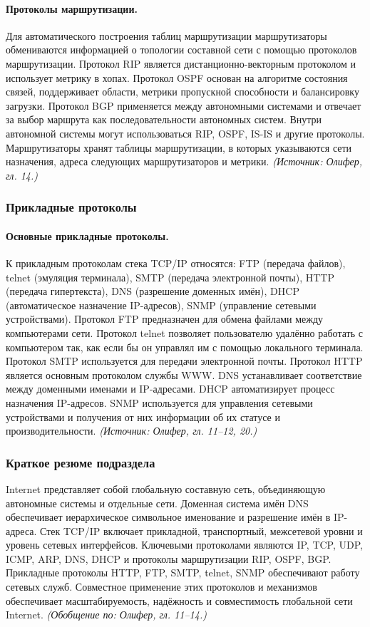 \documentclass[a4paper,12pt]{article}
\begin{document}
\paragraph{Протоколы маршрутизации.}
Для автоматического построения таблиц маршрутизации маршрутизаторы обмениваются информацией о топологии составной сети с помощью протоколов маршрутизации. Протокол RIP является дистанционно-векторным протоколом и использует метрику в хопах. Протокол OSPF основан на алгоритме состояния связей, поддерживает области, метрики пропускной способности и балансировку загрузки. Протокол BGP применяется между автономными системами и отвечает за выбор маршрута как последовательности автономных систем. Внутри автономной системы могут использоваться RIP, OSPF, IS-IS и другие протоколы. Маршрутизаторы хранят таблицы маршрутизации, в которых указываются сети назначения, адреса следующих маршрутизаторов и метрики.
\textit{(Источник: Олифер, гл. 14.)}

\subsubsection{Прикладные протоколы}

\paragraph{Основные прикладные протоколы.}
К прикладным протоколам стека TCP/IP относятся: FTP (передача файлов), telnet (эмуляция терминала), SMTP (передача электронной почты), HTTP (передача гипертекста), DNS (разрешение доменных имён), DHCP (автоматическое назначение IP-адресов), SNMP (управление сетевыми устройствами). Протокол FTP предназначен для обмена файлами между компьютерами сети. Протокол telnet позволяет пользователю удалённо работать с компьютером так, как если бы он управлял им с помощью локального терминала. Протокол SMTP используется для передачи электронной почты. Протокол HTTP является основным протоколом службы WWW. DNS устанавливает соответствие между доменными именами и IP-адресами. DHCP автоматизирует процесс назначения IP-адресов. SNMP используется для управления сетевыми устройствами и получения от них информации об их статусе и производительности.
\textit{(Источник: Олифер, гл. 11–12, 20.)}

\subsubsection{Краткое резюме подраздела}
Internet представляет собой глобальную составную сеть, объединяющую автономные системы и отдельные сети. Доменная система имён DNS обеспечивает иерархическое символьное именование и разрешение имён в IP-адреса. Стек TCP/IP включает прикладной, транспортный, межсетевой уровни и уровень сетевых интерфейсов. Ключевыми протоколами являются IP, TCP, UDP, ICMP, ARP, DNS, DHCP и протоколы маршрутизации RIP, OSPF, BGP. Прикладные протоколы HTTP, FTP, SMTP, telnet, SNMP обеспечивают работу сетевых служб. Совместное применение этих протоколов и механизмов обеспечивает масштабируемость, надёжность и совместимость глобальной сети Internet.
\textit{(Обобщение по: Олифер, гл. 11–14.)}
\end{document}

